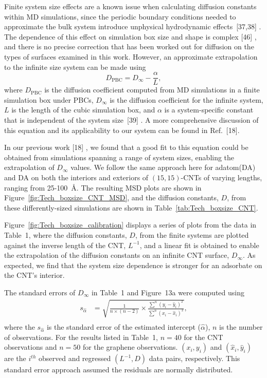 \documentclass[journal=jpcbfk, layout=twocolumn, manuscript=article]{achemso}
\newcommand\ddfrac[2]{\frac{\displaystyle #1}{\displaystyle #2}}
\begin{document}
Finite system size effects are a known issue when calculating diffusion constants within MD simulations, since the periodic boundary conditions needed to approximate the bulk system introduce unphysical hydrodynamic effects~[37,38]%
. The dependence of this effect on simulation box size and shape is complex [46]%
, and there is no precise correction that has been worked out for diffusion on the types of surfaces examined in this work. However, an approximate extrapolation to the infinite size system can be made using 
\begin{equation}
    D_\mathrm{PBC}=D_\infty-\ddfrac{\alpha}{L},
    \label{eqn:Tech_boxsize_carlibration}
\end{equation}
where $D_\mathrm{PBC}$ is the diffusion coefficient computed from MD simulations in a finite simulation box under PBCs, $D_\infty$ is the diffusion coefficient for the infinite system, $L$ is the length of the cubic simulation box, and $\alpha$ is a system-specific constant that is independent of the system size~[39]%
. A more comprehensive discussion of this equation and its applicability to our system can be found in Ref.~[18].%

In our previous work [18]%
,  we found that a good fit to this equation could be obtained from simulations spanning a range of system sizes, enabling the extrapolation of $D_{\infty}$ values. We follow the same approach here for adatom(DA) and DA on both the interiors and exteriors of $(15,15)$-CNTs of varying lengths, ranging from 25-100~\AA.  The resulting MSD plots are shown in Figure~\ref{fig:Tech_boxsize_CNT_MSD}, and the diffusion constants, $D$, from these differently-sized simulations are shown in Table~\ref{tab:Tech_boxsize_CNT}.

Figure~\ref{fig:Tech_boxsize_calibration} displays a series of plots from the data in Table~1, where the diffusion constants, $D$, from the finite systems are plotted against the inverse length of the CNT, $L^{-1}$, and a linear fit is obtained to enable the extrapolation of the diffusion constants on an infinite CNT surface, $D_\infty$. As expected, we find that the system size dependence is stronger for an adsorbate on the CNT's interior.

The standard errors of $D_\infty$ in Table~1 and Figure~13a were computed using
\begin{equation}
\begin{split}
s_{\hat\alpha}&=\sqrt{\ddfrac{1}{n\times(n-2)}\times\ddfrac{\sum^n(y_i-\hat{y}_i)^2}{\sum^n(x_i-\hat{x}_i)^2}},\\
\end{split}
\label{eqn:intercept_stderr}
\end{equation}
where the $s_{\hat\alpha}$ is the standard error of the estimated intercept (${\hat\alpha}$), $n$ is the number of observations. For the results listed in Table~1, $n=40$ for the CNT observations and $n=50$ for the graphene observations. $(x_i, y_i)$ and $(\hat{x}_i, \hat{y}_i)$ are the $i^{th}$ observed and regressed $(L^{-1}, D)$ data pairs, respectively. This standard error approach assumed the residuals are normally distributed.
\end{document}
